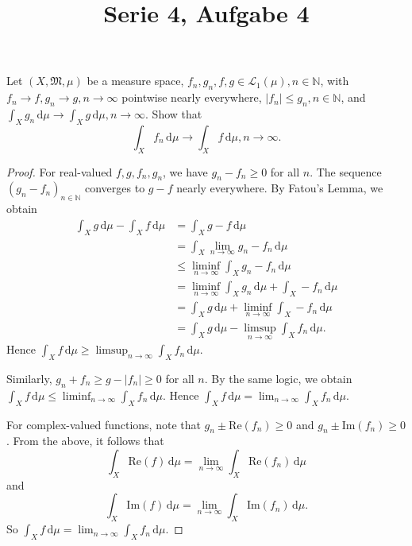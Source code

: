 \documentclass[10pt]{article}\usepackage[]{graphicx}\usepackage[]{color}
\title{Serie 4, Aufgabe 4}
\date{}
\newcommand{\N}{\mathbb{N}}
\newcommand{\df}{\,\textrm{d}}
\begin{document}
\maketitle

Let $(X, \mathfrak{M}, \mu)$ be a measure space,
$f_n, g_n, f, g \in \mathscr{L}_1(\mu), n \in \N$,
with $f_n \to f, g_n \to g, n \to \infty$ pointwise
nearly everywhere, $|f_n| \leq g_n, n \in \N$,
and $\int_X g_n \df \mu \to \int_X g \df \mu, n \to \infty$.
Show that
\[
  \int_X f_n \df \mu \to \int_X f \df \mu, n \to \infty.
\]

\begin{proof}
For real-valued $f, g, f_n, g_n$, 
we have $g_n - f_n \geq 0$ for all $n$.
The sequence $(g_n - f_n)_{n \in \N}$ converges to $g - f$ nearly
everywhere.
By Fatou's Lemma, we obtain
\begin{align*}
  \int_X g \df \mu - \int_X f \df \mu
  &= \int_X g - f \df \mu \\
  &= \int_X \lim_{n \to \infty} g_n - f_n \df \mu \\
  &\leq \liminf_{n \to \infty} \int_X g_n - f_n \df \mu \\
  &= \liminf_{n \to \infty} \int_X g_n \df \mu + \int_X -f_n \df \mu \\
  &= \int_X g \df \mu + \liminf_{n \to \infty} \int_X -f_n \df \mu \\
  &= \int_X g \df \mu - \limsup_{n \to \infty} \int_X f_n \df \mu.
\end{align*}
Hence $\int_X f \df \mu \geq \limsup_{n \to \infty} \int_X f_n \df \mu$.

Similarly, $g_n + f_n \geq g - |f_n| \geq 0$ for all $n$.
By the same logic, we obtain
$\int_X f \df \mu \leq \liminf_{n \to \infty} \int_X f_n \df \mu$.
Hence $\int_X f \df \mu = \lim_{n \to \infty} \int_X f_n \df \mu$.

For complex-valued functions, note that
$g_n \pm \textrm{Re}(f_n) \geq 0$
and $g_n \pm \textrm{Im}(f_n) \geq 0$.
From the above, it follows that
\[
\int_X \textrm{Re}(f) \df \mu = \lim_{n \to \infty} \int_X \textrm{Re}(f_n) \df \mu
\]
and
\[
\int_X \textrm{Im}(f) \df \mu = \lim_{n \to \infty} \int_X \textrm{Im}(f_n) \df \mu.
\]
So $\int_X f \df \mu = \lim_{n \to \infty} \int_X f_n \df \mu$.
\end{proof}
\end{document}
